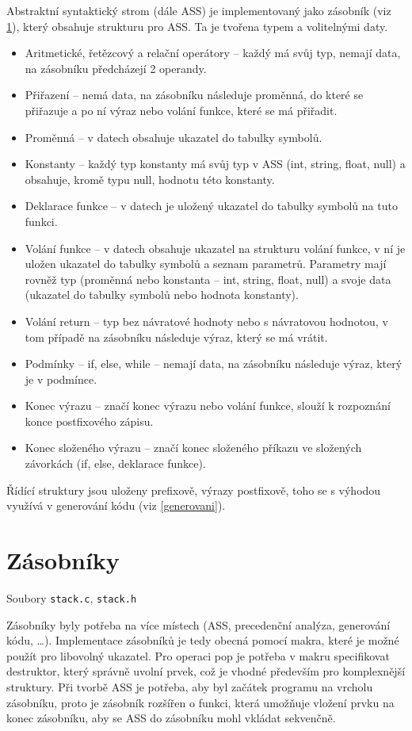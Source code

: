 \documentclass[a4paper, 12pt]{article}
\begin{document}
    Abstraktní syntaktický strom (dále ASS) je implementovaný jako zásobník (viz \ref{zasobniky}), který obsahuje strukturu pro ASS. Ta je tvořena typem a volitelnými daty.
    \begin{itemize}
        \item Aritmetické, řetězcový a relační operátory -- každý má svůj typ, nemají data, na zásobníku předcházejí 2 operandy.
        \item Přiřazení -- nemá data, na zásobníku následuje proměnná, do které se přiřazuje a po ní výraz nebo volání funkce, které se má přiřadit.
        \item Proměnná -- v datech obsahuje ukazatel do tabulky symbolů.
        \item Konstanty -- každý typ konstanty má svůj typ v ASS (int, string, float, null) a obsahuje, kromě typu null, hodnotu této konstanty.
        \item Deklarace funkce -- v datech je uložený ukazatel do tabulky symbolů na tuto funkci.
        \item Volání funkce -- v datech obsahuje ukazatel na strukturu volání funkce, v ní je uložen ukazatel do tabulky symbolů a seznam parametrů. Parametry mají rovněž typ (proměnná nebo konstanta -- int, string, float, null) a svoje data (ukazatel do tabulky symbolů nebo hodnota konstanty).
        \item Volání return -- typ bez návratové hodnoty nebo s návratovou hodnotou, v tom případě na zásobníku následuje výraz, který se má vrátit.
        \item Podmínky -- if, else, while -- nemají data, na zásobníku následuje výraz, který je v podmínce.
        \item Konec výrazu -- značí konec výrazu nebo volání funkce, slouží k rozpoznání konce postfixového zápisu.
        \item Konec složeného výrazu -- značí konec složeného příkazu ve složených závorkách (if, else, deklarace funkce).
    \end{itemize}
    Řídící struktury jsou uloženy prefixově, výrazy postfixově, toho se s výhodou využívá v generování kódu (viz \ref{generovani}).
    \section{Zásobníky} \label{zasobniky}
    Soubory \texttt{stack.c}, \texttt{stack.h}
    
    Zásobníky byly potřeba na více místech (ASS, precedenční analýza, generování kódu, \ldots). Implementace zásobníků je tedy obecná pomocí makra, které je možné použít pro libovolný ukazatel. Pro operaci pop je potřeba v makru specifikovat destruktor, který správně uvolní prvek, což je vhodné především pro komplexnější struktury. Při tvorbě ASS je potřeba, aby byl začátek programu na vrcholu zásobníku, proto je zásobník rozšířen o funkci, která umožňuje vložení prvku na konec zásobníku, aby se ASS do zásobníku mohl vkládat sekvenčně.
\end{document}
